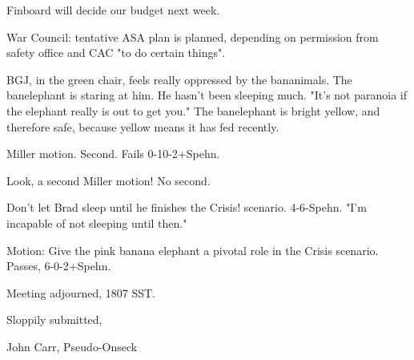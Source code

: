 \documentclass[12pt]{article}
\begin{document}
Finboard will decide our budget next week.

War Council: tentative ASA plan is planned, depending on permission from safety office and CAC "to do certain things".

BGJ, in the green chair, feels really oppressed by the bananimals. The banelephant is staring at him.  He hasn't been sleeping much. "It's not paranoia if the elephant really is out to get you."  The banelephant is bright yellow, and therefore safe, because yellow means it has fed recently.

Miller motion. Second. Fails 0-10-2+Spehn.

Look, a second Miller motion! No second.

Don't let Brad sleep until he finishes the Crisis! scenario. 4-6-Spehn. "I'm incapable of not sleeping until then."

Motion: Give the pink banana elephant a pivotal role in the Crisis scenario. Passes, 6-0-2+Spehn.

\vspace{12pt}

\noindent
Meeting adjourned, 1807 SST.

\vspace{18pt}

\centerline{Sloppily submitted,}
\centerline{John Carr, Pseudo-Onseck}
\end{document}
